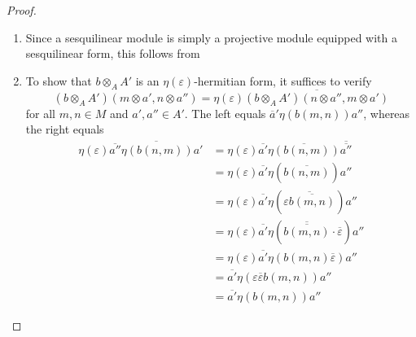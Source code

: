 \begin{proof}
    \begin{enumerate}
        \item Since a sesquilinear module is simply a projective module equipped with a sesquilinear form, this follows from 
        \item To show that $b \otimes_A A'$ is an $\eta(\varepsilon)$-hermitian form, it suffices to verify
        $$(b \otimes_A A') (m \otimes a', n \otimes a'') = \eta(\varepsilon) \overline{(b \otimes_A A')(n \otimes a'', m \otimes a')}$$
        for all $m,n \in M$ and $a',a'' \in A'$. The left equals $\overline{a}' \eta(b(m,n)) a''$, whereas the right equals 
        \begin{align*}
        \eta(\varepsilon) \overline{ \overline{a''} \eta(b(n,m)) a'} &= \eta(\varepsilon) \overline{a'} \overline{\eta(b(n,m))} \overline{\overline{a''}} \\
        &= \eta(\varepsilon) \overline{a'} \eta(\overline{b(n,m)}) a'' \\
        &= \eta(\varepsilon) \overline{a'} \eta(\overline{\varepsilon \overline{b(m,n)}}) a'' \\
        &= \eta(\varepsilon) \overline{a'} \eta(\overline{\overline{b(m,n)}} \cdot \overline{\varepsilon}) a'' \\
        &= \eta(\varepsilon) \overline{a'} \eta(b(m,n) \overline{\varepsilon}) a'' \\
        &= \overline{a'} \eta(\varepsilon \overline{\varepsilon} b(m,n)) a'' \\
        &= \overline{a'} \eta(b(m,n)) a''
        \end{align*}


    \end{enumerate}
\end{proof}